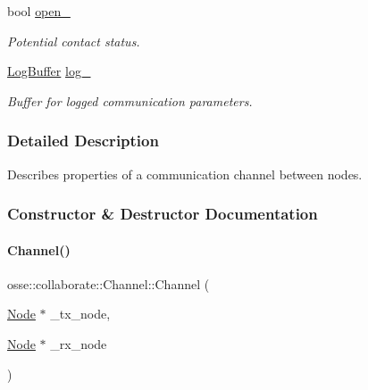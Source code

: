 \begin{DoxyCompactItemize}
bool \hyperlink{classosse_1_1collaborate_1_1_channel_a269d85437ed1de4d35d67c06257b72c0}{open\+\_\+}
\begin{DoxyCompactList}\small\item\em Potential contact status. \end{DoxyCompactList}\item 
\mbox{\label{classosse_1_1collaborate_1_1_channel_af7057de27216b3871fb9ef97e5c14e31}} 
\hyperlink{structosse_1_1collaborate_1_1_channel_1_1_log_buffer}{Log\+Buffer} \hyperlink{classosse_1_1collaborate_1_1_channel_af7057de27216b3871fb9ef97e5c14e31}{log\+\_\+}
\begin{DoxyCompactList}\small\item\em Buffer for logged communication parameters. \end{DoxyCompactList}\end{DoxyCompactItemize}


\subsubsection{Detailed Description}
Describes properties of a communication channel between nodes. 

\subsubsection{Constructor \& Destructor Documentation}
\mbox{\label{classosse_1_1collaborate_1_1_channel_a2f160167f6144d6c2c6d91639b003e47}} 
\paragraph{\texorpdfstring{Channel()}{Channel()}}
{\footnotesize\ttfamily osse\+::collaborate\+::\+Channel\+::\+Channel (\begin{DoxyParamCaption}\item[{\hyperlink{classosse_1_1collaborate_1_1_node}{Node} $\ast$}]{\+\_\+tx\+\_\+node,  }\item[{\hyperlink{classosse_1_1collaborate_1_1_node}{Node} $\ast$}]{\+\_\+rx\+\_\+node }\end{DoxyParamCaption})}



